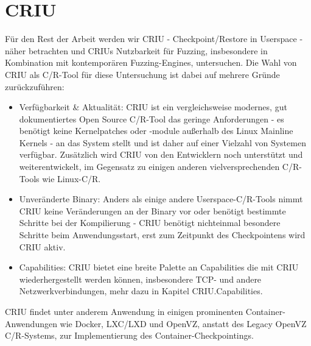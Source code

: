 \documentclass[a4paper]{article}
\begin{document}



\section{CRIU}
Für den Rest der Arbeit werden wir CRIU - Checkpoint/Restore in Userspace - näher betrachten und CRIUs Nutzbarkeit für Fuzzing, insbesondere in Kombination mit kontemporären Fuzzing-Engines, untersuchen. Die Wahl von CRIU als C/R-Tool für diese Untersuchung ist dabei auf mehrere Gründe zurückzuführen:
\begin{itemize}
    \item Verfügbarkeit \& Aktualität: CRIU ist ein vergleichsweise modernes, gut dokumentiertes Open Source C/R-Tool das geringe Anforderungen - es benötigt keine Kernelpatches oder -module außerhalb des Linux Mainline Kernels - an das System stellt und ist daher auf einer Vielzahl von Systemen verfügbar. Zusätzlich wird CRIU von den Entwicklern noch unterstützt und weiterentwickelt, im Gegensatz zu einigen anderen vielversprechenden C/R-Tools wie Linux-C/R.
    \item Unveränderte Binary: Anders als einige andere Userspace-C/R-Tools nimmt CRIU keine Veränderungen an der Binary vor oder benötigt bestimmte Schritte bei der Kompilierung - CRIU benötigt nichteinmal besondere Schritte beim Anwendungsstart, erst zum Zeitpunkt des Checkpointens wird CRIU aktiv.
    \item Capabilities: CRIU bietet eine breite Palette an Capabilities die mit CRIU wiederhergestellt werden können, insbesondere TCP- und andere Netzwerkverbindungen, mehr dazu in Kapitel CRIU.Capabilities.
\end{itemize}
CRIU findet unter anderem Anwendung in einigen prominenten Container-Anwendungen wie Docker, LXC/LXD und OpenVZ, anstatt des Legacy OpenVZ C/R-Systems, zur Implementierung des Container-Checkpointings.\\
\end{document}
